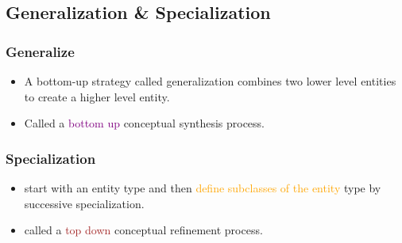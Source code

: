 \documentclass[a4paper, 12pt]{article}
\begin{document}
    \subsection{Generalization \& Specialization}
       \subsubsection{Generalize}
       \begin{itemize}
        \item A bottom-up strategy called generalization \textcolor{light-blue}{combines two lower level entities
        to create a higher level entity}.
        \item  Called a \textcolor{purple}{bottom up} conceptual synthesis process.
       \end{itemize}

       \subsubsection{Specialization}
       \begin{itemize}
        \item start with an entity type and then \textcolor{orange}{define subclasses of the entity} type by
        successive specialization.
        \item  called a \textcolor{brown}{top down} conceptual refinement process.
       \end{itemize}
\end{document}

